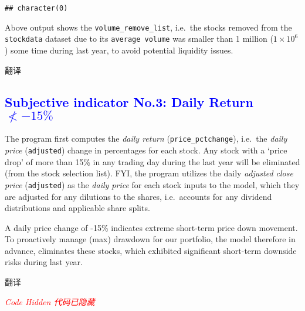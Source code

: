 \documentclass[
]{book}
\begin{document}
\begin{verbatim}
## character(0)
\end{verbatim}

Above output shows the \texttt{volume\_remove\_list}, i.e.~the stocks
removed from the \texttt{stockdata} dataset due to its
\texttt{average\ volume} was smaller than 1 million (\(1\times 10^6\))
some time during last year, to avoid potential liquidity issues.

翻译

\hypertarget{section-2}{%
\subsection{\texorpdfstring{\textcolor{blue}{Subjective indicator No.3: Daily Return $\nless -15\%$}}{}}\label{section-2}}

The program first computes the \emph{daily return}
(\texttt{price\_pctchange}), i.e.~the \emph{daily price}
(\texttt{adjusted}) change in percentages for each stock. Any stock with
a `price drop' of more than 15\% in any trading day during the last year
will be eliminated (from the stock selection list). FYI, the program
utilizes the daily \emph{adjusted close price} (\texttt{adjusted}) as
the \emph{daily price} for each stock inputs to the model, which they
are adjusted for any dilutions to the shares, i.e.~accounts for any
dividend distributions and applicable share splits.

A daily price change of -15\% indicates extreme short-term price down
movement. To proactively manage (max) drawdown for our portfolio, the
model therefore in advance, eliminates these stocks, which exhibited
significant short-term downside risks during last year.

翻译

\emph{\textcolor{red}{Code Hidden 代码已隐藏}}
\end{document}
